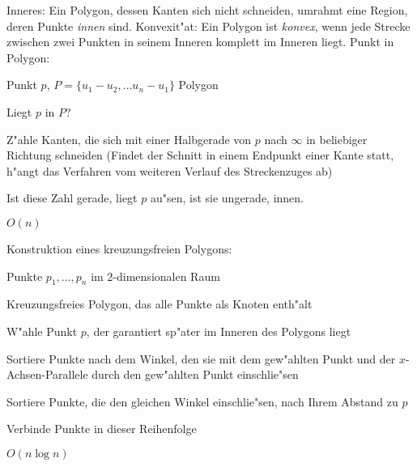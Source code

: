  Inneres:{
  Ein Polygon, dessen Kanten sich nicht schneiden, umrahmt eine Region, 
  deren Punkte \textit{innen} sind.
}
 Konvexit"at:{
  Ein Polygon ist \textit{konvex}, wenn jede Strecke zwischen zwei 
  Punkten in seinem Inneren komplett im Inneren liegt.
}
\algorithm Punkt in Polygon:{
  \given Punkt $p$, $P=\{u_1-u_2,\ldots u_n-u_1\}$ Polygon
  
  \aim Liegt $p$ in $P$?
  
  \begin{proc}
    \item Z"ahle Kanten, die sich mit einer Halbgerade von $p$ nach $\infty$ in
      beliebiger Richtung schneiden (Findet der Schnitt in einem Endpunkt einer
      Kante statt, h"angt das Verfahren vom weiteren Verlauf des Streckenzuges ab)
    \item Ist diese Zahl gerade, liegt $p$ au"sen, ist sie ungerade, innen.
  \end{proc}
  
  \cpx $O(n)$
}
\algorithm Konstruktion eines kreuzungsfreien Polygons:{
  \given Punkte $p_1,\ldots,p_n$ im $2$-dimensionalen Raum
  
  \aim Kreuzungsfreies Polygon, das alle Punkte als Knoten enth"alt
  
  \begin{proc}
    \item W"ahle Punkt $p$, der garantiert sp"ater im Inneren des Polygons liegt
    \item Sortiere Punkte nach dem Winkel, den sie mit dem gew"ahlten Punkt 
      und der $x$-Achsen-Parallele durch den gew"ahlten Punkt einschlie"sen
    \item Sortiere Punkte, die den gleichen Winkel einschlie"sen, nach Ihrem 
      Abstand zu $p$
    \item Verbinde Punkte in dieser Reihenfolge
  \end{proc}
  
  \cpx $O(n\log n)$
}
